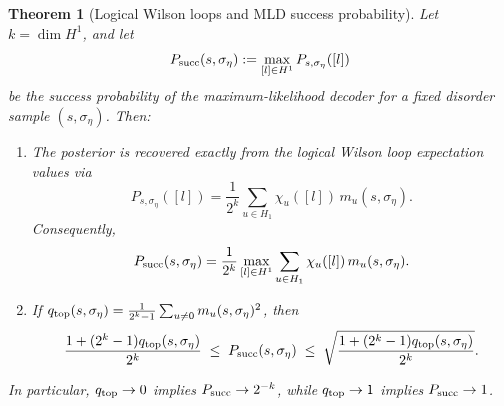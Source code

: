 \documentclass[twoside,english,aps,showpacs,pra,superscriptaddress]{revtex4-2}
\newtheorem{theorem}{Theorem}
\begin{document}
\begin{theorem}[Logical Wilson loops and MLD success probability]
Let \(k=\dim H^1\), and let
\begin{equation}
    P_{\rm succ}(s,\sigma_\eta):=\max_{[l]\in H^1} P_{s,\sigma_\eta}([l])
\end{equation}
be the success probability of the maximum-likelihood decoder for a fixed disorder sample \((s,\sigma_\eta)\). Then:
\begin{enumerate}
    \item The posterior is recovered exactly from the logical Wilson loop expectation values via
    \begin{equation}\label{eq:fourier-inversion-posterior}
        P_{s,\sigma_\eta}([l])=\frac{1}{2^k}\sum_{u\in H_1} \chi_u([l])\,m_u(s,\sigma_\eta).
    \end{equation}
    Consequently,
    \begin{equation}\label{eq:exact-success}
        P_{\rm succ}(s,\sigma_\eta)
        =\frac{1}{2^k}\max_{[l]\in H^1}\sum_{u\in H_1} \chi_u([l])\,m_u(s,\sigma_\eta).
    \end{equation}
    \item If \(q_{\rm top}(s,\sigma_\eta)=\frac{1}{2^k-1}\sum_{u\neq 0}m_u(s,\sigma_\eta)^2\), then
    \begin{equation}\label{eq:success-bounds}
        \frac{1+(2^k-1)q_{\rm top}(s,\sigma_\eta)}{2^k}
        \;\le\;
        P_{\rm succ}(s,\sigma_\eta)
        \;\le\;
        \sqrt{\frac{1+(2^k-1)q_{\rm top}(s,\sigma_\eta)}{2^k}}.
    \end{equation}
\end{enumerate}
In particular, \(q_{\rm top}\to 0\) implies \(P_{\rm succ}\to 2^{-k}\), while \(q_{\rm top}\to 1\) implies \(P_{\rm succ}\to 1\).
\end{theorem}
\end{document}
